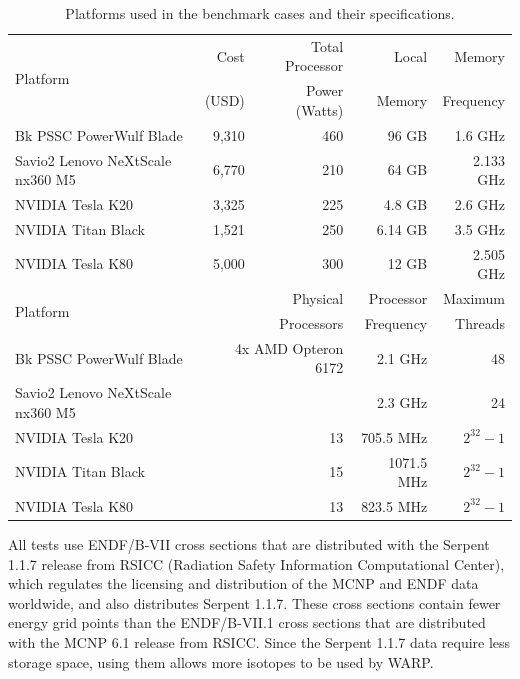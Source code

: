 \documentclass[preprint,12pt]{elsarticle}
\begin{document}
\begin{table}[h]
\centering
\caption{Platforms used in the benchmark cases and their specifications.}
\label{platform_table}
\small
\begin{tabular}{| l | r | r | r | r |}
\hline
\multirow{2}{*}{Platform} &  Cost   &Total Processor  & Local       & Memory     \\
                                       & (USD)  & Power (Watts) & Memory  & Frequency \\
\hline
Bk PSSC PowerWulf Blade       &    9,310   & 460 &  96 GB        &  1.6 GHz                    \\
\hline
Savio2 Lenovo NeXtScale nx360 M5       &   6,770    &  210  &  64 GB        & 2.133  GHz                    \\
\hline
NVIDIA Tesla K20         &    3,325     & 225 &  4.8  GB      &  2.6 GHz                  \\
\hline
NVIDIA Titan Black       &    1,521   & 250 &  6.14 GB        & 3.5 GHz              \\
\hline
NVIDIA Tesla K80       &    5,000    & 300 &  12 GB        &  2.505 GHz              \\
\hline
\hline
\hline
\multirow{2}{*}{Platform}  &  \multicolumn{2}{r|}{Physical }     & Processor  & Maximum \\
                                        & \multicolumn{2}{r|}{Processors}  & Frequency  & Threads \\
\hline
Bk PSSC PowerWulf Blade       &   \multicolumn{2}{r|}{4x AMD Opteron 6172 }  &  2.1 GHz     &  48           \\
\hline
Savio2 Lenovo NeXtScale nx360 M5   &   \multicolumn{2}{r|}{ }  &  2.3 GHz     &  24           \\
\hline
NVIDIA Tesla K20         &       \multicolumn{2}{r|}{13}   &  705.5 MHz     &  $2^{32}-1$           \\
\hline
NVIDIA Titan Black       &      \multicolumn{2}{r|}{ 15 }  &  1071.5 MHz     & $2^{32}-1$           \\
\hline
NVIDIA Tesla K80      &      \multicolumn{2}{r|}{ 13 }  &  823.5 MHz     & $2^{32}-1$           \\
\hline

\end{tabular}
\end{table}

All tests use ENDF/B-VII cross sections that are distributed with the Serpent 1.1.7 release from RSICC (Radiation Safety Information Computational Center), which regulates the licensing and distribution of the MCNP and ENDF data worldwide, and also distributes Serpent 1.1.7.  These cross sections contain fewer energy grid points than the ENDF/B-VII.1 cross sections that are distributed with the MCNP 6.1 release from RSICC.  Since the Serpent 1.1.7 data require less storage space, using them allows more isotopes to be used by WARP.
\end{document}
